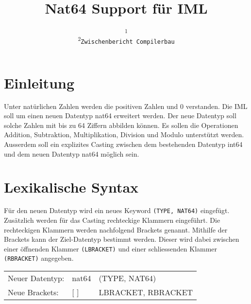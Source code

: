\documentclass[10pt, a4paper, twocolumn]{article} %
\title{Nat64 Support für IML} %
\author{
	\authorstyle{Marco Romanutti\textsuperscript{1,2} und Benjamin Meyer\textsuperscript{1,2}} %
	\newline\newline %
	\textsuperscript{1}\institution{Fachhochschule Nordwestschweiz FHNW, Brugg}\\ %
	\textsuperscript{2}\texttt{Zwischenbericht Compilerbau} %
}
\date{}
\begin{document}
\maketitle %

\thispagestyle{firstpage} %



\section{Einleitung}

Unter natürlichen Zahlen werden die positiven Zahlen und 0 verstanden. Die IML soll um einen neuen Datentyp nat64 erweitert werden. Der neue Datentyp soll solche Zahlen mit bis zu 64 Ziffern abbilden können. Es sollen die Operationen Addition, Subtraktion, Multiplikation, Division und Modulo  unterstützt werden. Ausserdem soll ein explizites Casting zwischen dem bestehenden Datentyp int64 und dem neuen Datentyp nat64 möglich sein.

\section{Lexikalische Syntax}
Für den neuen Datentyp wird ein neues Keyword \texttt{(TYPE, NAT64)} eingefügt.
Zusätzlich werden für das Casting rechteckige Klammern eingeführt.
Die rechteckigen Klammern werden nachfolgend Brackets genannt.
Mithilfe der Brackets kann der Ziel-Datentyp bestimmt werden.
Dieser wird dabei zwischen einer öffnenden Klammer \texttt{(LBRACKET)} und einer schliessenden Klammer \texttt{(RBRACKET)} angegeben.

\begin{table}[h]
\centering
\small
\begin{tabular}{lll}
Neuer Datentyp: & nat64   & (TYPE, NAT64)      \\
Neue Brackets: & [ ] & LBRACKET, RBRACKET
\end{tabular}
\end{table}
\end{document}
